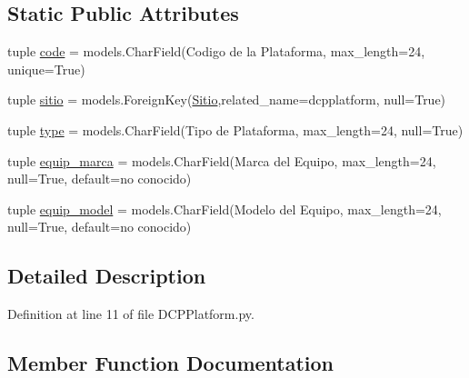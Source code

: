 \subsection*{Static Public Attributes}
\begin{DoxyCompactItemize}
\item 
tuple \hyperlink{class_ground_segment_1_1models_1_1_d_c_p_platform_1_1_d_c_p_platform_a7af6594b95c64b88b931f0a666c21d30}{code} = models.\+Char\+Field(\textquotesingle{}Codigo de la Plataforma\textquotesingle{}, max\+\_\+length=24, unique=True)
\item 
tuple \hyperlink{class_ground_segment_1_1models_1_1_d_c_p_platform_1_1_d_c_p_platform_a40c6a8b2d8b8ff4122c8544088abbc4f}{sitio} = models.\+Foreign\+Key(\hyperlink{class_ground_segment_1_1models_1_1_sitio_1_1_sitio}{Sitio},related\+\_\+name=\textquotesingle{}dcpplatform\textquotesingle{}, null=True)
\item 
tuple \hyperlink{class_ground_segment_1_1models_1_1_d_c_p_platform_1_1_d_c_p_platform_afc4749d3d62ae4e61dc88282b464acd5}{type} = models.\+Char\+Field(\textquotesingle{}Tipo de Plataforma\textquotesingle{}, max\+\_\+length=24, null=True)
\item 
tuple \hyperlink{class_ground_segment_1_1models_1_1_d_c_p_platform_1_1_d_c_p_platform_a346a81e102556b5b1d6e0ffec497b25e}{equip\+\_\+marca} = models.\+Char\+Field(\textquotesingle{}Marca del Equipo\textquotesingle{}, max\+\_\+length=24, null=True, default=\textquotesingle{}no conocido\textquotesingle{})
\item 
tuple \hyperlink{class_ground_segment_1_1models_1_1_d_c_p_platform_1_1_d_c_p_platform_aa74953b95834477d12df1461d8998fa9}{equip\+\_\+model} = models.\+Char\+Field(\textquotesingle{}Modelo del Equipo\textquotesingle{}, max\+\_\+length=24, null=True, default=\textquotesingle{}no conocido\textquotesingle{})
\end{DoxyCompactItemize}


\subsection{Detailed Description}


Definition at line 11 of file D\+C\+P\+Platform.\+py.



\subsection{Member Function Documentation}
\hypertarget{class_ground_segment_1_1models_1_1_d_c_p_platform_1_1_d_c_p_platform_a220b5f4f794b750e6e14bf99b5aa3d0e}{}
